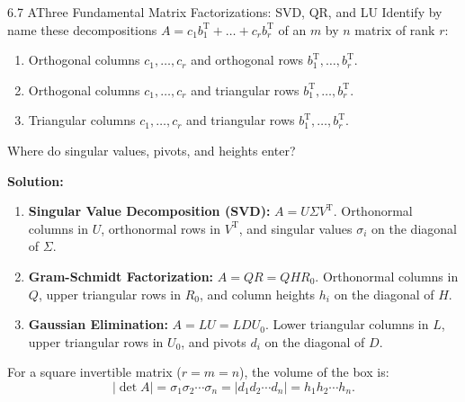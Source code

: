 \documentclass[11pt,a4paper,openany,oneside]{book}
\def\vect#1{#1}%
\def\mathbf#1{#1}%
\newcommand{\vect}[1]{\mathbf{#1}}
\newcommand{\T}{\mathrm{T}}
\numberwithin{equation}{chapter}
\begin{document}
\begin{example}{6.7 A}{Three Fundamental Matrix Factorizations: SVD, QR, and LU}
Identify by name these decompositions $A = \vect{c}_1\vect{b}_1^\T + \dots + \vect{c}_r\vect{b}_r^\T$ of an $m$ by $n$ matrix of rank $r$:
\begin{enumerate}
\item Orthogonal columns $\vect{c}_1, \dots, \vect{c}_r$ and orthogonal rows $\vect{b}_1^\T, \dots, \vect{b}_r^\T$.
\item Orthogonal columns $\vect{c}_1, \dots, \vect{c}_r$ and triangular rows $\vect{b}_1^\T, \dots, \vect{b}_r^\T$.
\item Triangular columns $\vect{c}_1, \dots, \vect{c}_r$ and triangular rows $\vect{b}_1^\T, \dots, \vect{b}_r^\T$.
\end{enumerate}
Where do singular values, pivots, and heights enter?
\end{example}
\textbf{Solution:}
\begin{enumerate}
\item \textbf{Singular Value Decomposition (SVD):} $A = U\Sigma V^\T$. Orthonormal columns in $U$, orthonormal rows in $V^\T$, and singular values $\sigma_i$ on the diagonal of $\Sigma$.
\item \textbf{Gram-Schmidt Factorization:} $A = QR = QHR_0$. Orthonormal columns in $Q$, upper triangular rows in $R_0$, and column heights $h_i$ on the diagonal of $H$.
\item \textbf{Gaussian Elimination:} $A = LU = LDU_0$. Lower triangular columns in $L$, upper triangular rows in $U_0$, and pivots $d_i$ on the diagonal of $D$.
\end{enumerate}
For a square invertible matrix ($r = m = n$), the volume of the box is:
\[
|\det A| = \sigma_1\sigma_2\cdots\sigma_n = |d_1 d_2 \cdots d_n| = h_1 h_2 \cdots h_n.
\]
\end{document}
